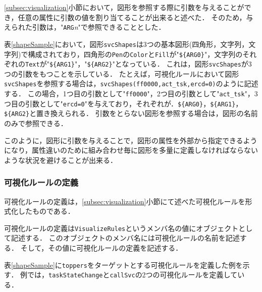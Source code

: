 \ref{subsec:visualization}小節において，図形を参照する際に引数を与えることができ，任意の属性に引数の値を割り当てることが出来ると述べた．
そのため，与えられた引数は，"{\tt ARG}{\it n}"で参照できることとした．

表\ref{shapeSample}において，図形{\tt svcShapes}は3つの基本図形(四角形，文字列，文字列)で構成されており，四角形の{\tt Pen}の{\tt Color}と{\tt Fill}が"\verb|${ARG0}|"，文字列のそれぞれの{\tt Text}が"\verb|${ARG1}|"，"\verb|${ARG2}|"となっている．
これは，図形{\tt svcShapes}が3つの引数をもつことを示している．
たとえば，可視化ルールにおいて図形{\tt svcShapes}を参照する場合は，\verb|svcShapes(ff0000,act_tsk,ercd=0)|のように記述する．
この場合，1つ目の引数として"{\tt ff0000}"，2つ目の引数として"{\tt act\_tsk}"，3つ目の引数として"{\tt ercd=0}"を与えており，それぞれが．\verb|${ARG0}|，\verb|${ARG1}|，\verb|${ARG2}|と置き換えられる．
引数をとらない図形を参照する場合は，図形の名前のみで参照できる．

このように，図形に引数を与えることで，図形の属性を外部から指定できるようになり，属性違いのために組み合わせ毎に図形を多量に定義しなければならないような状況を避けることが出来る．

\subsubsection{可視化ルールの定義}

可視化ルールの定義は，\ref{subsec:visualization}小節にて述べた可視化ルールを形式化したものである．

可視化ルールの定義は{\tt VisualizeRules}というメンバ名の値にオブジェクトとして記述する．
このオブジェクトのメンバ名には可視化ルールの名前を記述する．
そして，その値に可視化ルールの定義を記述する．

表\ref{shapeSample}に{\tt toppers}をターゲットとする可視化ルールを定義した例を示す．
例では，{\tt taskStateChange}と{\tt callSvc}の2つの可視化ルールを定義している．

